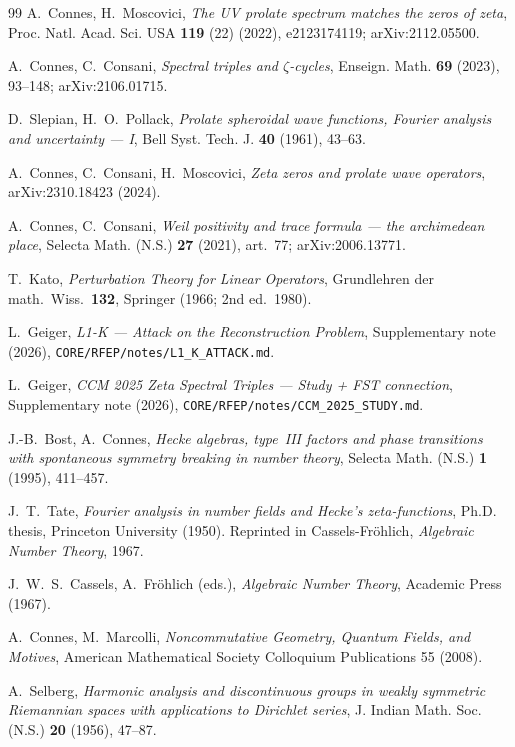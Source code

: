 \documentclass[11pt,a4paper]{article}
\theoremstyle{plain}
\theoremstyle{definition}
\begin{document}
\begin{thebibliography}{99}
A.~Connes, H.~Moscovici,
\textit{The UV prolate spectrum matches the zeros of zeta},
Proc. Natl. Acad. Sci. USA \textbf{119} (22) (2022), e2123174119;
arXiv:2112.05500.

A.~Connes, C.~Consani,
\textit{Spectral triples and $\zeta$-cycles},
Enseign. Math. \textbf{69} (2023), 93--148; arXiv:2106.01715.

D.~Slepian, H.~O.~Pollack,
\textit{Prolate spheroidal wave functions, Fourier analysis and
uncertainty --- I},
Bell Syst. Tech. J. \textbf{40} (1961), 43--63.

A.~Connes, C.~Consani, H.~Moscovici,
\textit{Zeta zeros and prolate wave operators},
arXiv:2310.18423 (2024).

A.~Connes, C.~Consani,
\textit{Weil positivity and trace formula --- the archimedean place},
Selecta Math. (N.S.) \textbf{27} (2021), art.~77; arXiv:2006.13771.

T.~Kato,
\textit{Perturbation Theory for Linear Operators},
Grundlehren der math.\ Wiss.\ \textbf{132}, Springer (1966; 2nd ed.\ 1980).

L.~Geiger,
\textit{L1-K --- Attack on the Reconstruction Problem},
Supplementary note (2026),
\texttt{CORE/RFEP/notes/L1\_K\_ATTACK.md}.

L.~Geiger,
\textit{CCM 2025 Zeta Spectral Triples --- Study + FST connection},
Supplementary note (2026),
\texttt{CORE/RFEP/notes/CCM\_2025\_STUDY.md}.

J.-B.~Bost, A.~Connes,
\textit{Hecke algebras, type~III factors and phase transitions
with spontaneous symmetry breaking in number theory},
Selecta Math. (N.S.) \textbf{1} (1995), 411--457.

J.~T.~Tate,
\textit{Fourier analysis in number fields and Hecke's
zeta-functions},
Ph.D. thesis, Princeton University (1950). Reprinted in
Cassels-Fr\"ohlich, \emph{Algebraic Number Theory}, 1967.

J.~W.~S.~Cassels, A.~Fr\"ohlich (eds.),
\textit{Algebraic Number Theory},
Academic Press (1967).

A.~Connes, M.~Marcolli,
\textit{Noncommutative Geometry, Quantum Fields, and Motives},
American Mathematical Society Colloquium Publications 55 (2008).

A.~Selberg,
\textit{Harmonic analysis and discontinuous groups in weakly
symmetric Riemannian spaces with applications to Dirichlet series},
J. Indian Math. Soc. (N.S.) \textbf{20} (1956), 47--87.


\end{thebibliography}
\end{document}
